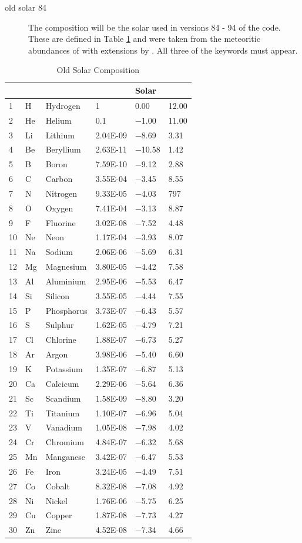 \begin{description}
\item[old solar 84]  The composition will be the
solar used in versions 84 - 94 of the code.
These are defined in Table \ref{tab:CompositionSolarOld}
and were taken from the
meteoritic abundances of \citet{Grevesse1989} with extensions by
\citet{Grevesse1993}.
All three of the keywords  must appear.
\end{description}

\begin{table}
\centering
\caption{Old Solar Composition}
\label{tab:CompositionSolarOld}
\begin{tabular}{llllll}
\hline
&&&&Solar\\
\hline
1& H& Hydrogen& 1& 0.00& 12.00\\
2& He& Helium& 0.1& $-$1.00& 11.00\\
3& Li& Lithium& 2.04E-09& $-$8.69& 3.31\\
4& Be& Beryllium&  2.63E-11& $-$10.58&1.42\\
5& B& Boron&  7.59E-10& $-$9.12&2.88\\
\hline
6& C& Carbon&  3.55E-04&$-$3.45& 8.55\\
7& N& Nitrogen& 9.33E-05& $-$4.03& 797\\
8& O& Oxygen& 7.41E-04& $-$3.13& 8.87\\
9& F& Fluorine& 3.02E-08&  $-$7.52&4.48\\
10& Ne& Neon& 1.17E-04& $-$3.93& 8.07\\
\hline
11& Na& Sodium& 2.06E-06& $-$5.69& 6.31\\
12& Mg& Magnesium& 3.80E-05& $-$4.42& 7.58\\
13& Al& Aluminium& 2.95E-06& $-$5.53& 6.47\\
14& Si& Silicon& 3.55E-05& $-$4.44& 7.55\\
15& P& Phosphorus& 3.73E-07& $-$6.43& 5.57\\
\hline
16& S& Sulphur& 1.62E-05& $-$4.79& 7.21\\
17& Cl& Chlorine& 1.88E-07& $-$6.73& 5.27\\
18& Ar& Argon& 3.98E-06& $-$5.40& 6.60\\
19& K& Potassium& 1.35E-07& $-$6.87& 5.13\\
20& Ca& Calcicum&  2.29E-06&$-$5.64& 6.36\\
\hline
21& Sc& Scandium&  1.58E-09&  $-$8.80& 3.20\\
22& Ti& Titanium&  1.10E-07& $-$6.96& 5.04\\
23& V& Vanadium& 1.05E-08& $-$7.98& 4.02\\
24& Cr& Chromium&  4.84E-07& $-$6.32& 5.68\\
25& Mn& Manganese& 3.42E-07& $-$6.47& 5.53\\
\hline
26& Fe& Iron& 3.24E-05& $-$4.49& 7.51\\
27& Co& Cobalt&  8.32E-08& $-$7.08& 4.92\\
28& Ni& Nickel&  1.76E-06& $-$5.75& 6.25\\
29& Cu& Copper& 1.87E-08& $-$7.73& 4.27\\
30& Zn& Zinc& 4.52E-08& $-$7.34& 4.66\\
\hline
\end{tabular}
\end{table}

